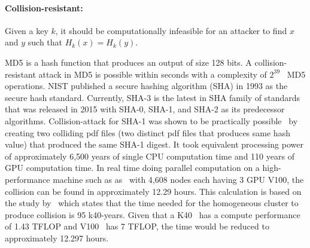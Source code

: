 \paragraph{Collision-resistant:} Given a key $k$, it should be computationally
infeasible for an attacker to find $x$ and $y$ such that $H_k(x) = H_k(y)$.
\par   
MD5 is a hash function that produces an output of size 128 bits. A
collision-resistant attack in MD5 is possible within seconds with a complexity
of $2^{39}$~\cite{wang2005break} MD5 operations. NIST published a secure
hashing algorithm (SHA) in 1993 as the secure hash standard. Currently, SHA-3
is the latest in SHA family of standards that was released in 2015 with SHA-0,
SHA-1, and SHA-2 as its predecessor algorithms. Collision-attack for SHA-1 was
shown to be practically possible~\cite{stevens2017first} by creating two
colliding pdf files (two distinct pdf files that produces same hash value) that
produced the same SHA-1 digest. It took equivalent processing power of
approximately 6,500 years of single CPU computation time and 110 years of GPU
computation time. In real time doing parallel computation on a high-performance
machine such as as~\cite{oakridge,top500} with 4,608 nodes each having 3 GPU
V100, the collision can be found in approximately 12.29 hours. This calculation
is based on the study by~\cite{stevens2017first} which states that the time
needed for the homogeneous cluster to produce collision is 95 k40-years. Given
that a K40~\cite{k40} has a compute performance of 1.43 TFLOP and
V100~\cite{v100} has 7 TFLOP, the time would be reduced to approximately 12.297
hours.\par

